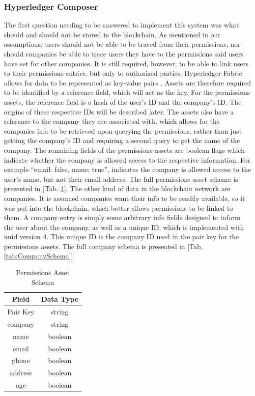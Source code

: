 \documentclass[11pt,journal]{IEEEtran}
\begin{document}
\subsubsection{Hyperledger Composer}
The first question needing to be answered to implement this system was what should and should not be stored in the blockchain. As mentioned in our assumptions, users should not be able to be traced from their permissions, nor should companies be able to trace users they have to the permissions said users have set for other companies. It is still required, however, to be able to link users to their permissions entries, but only to authorized parties. Hyperledger Fabric allows for data to be represented as key-value pairs \cite{WhyHyper54:online}. Assets are therefore required to be identified by a reference field, which will act as the key. For the permissions assets, the reference field is a hash of the user’s ID and the company’s ID. The origins of these respective IDs will be described later. The assets also have a reference to the company they are associated with, which allows for the companies info to be retrieved upon querying the permissions, rather than just getting the company’s ID and requiring a second query to get the name of the company. The remaining fields of the permissions assets are boolean flags which indicate whether the company is allowed access to the respective information. For example “email: false, name: true”, indicates the company is allowed access to the user’s name, but not their email address. The full permissions asset schema is presented in [Tab. \ref{tab:PermissionsSchema}]. The other kind of data in the blockchain network are companies. It is assumed companies want their info to be readily available, so it was put into the blockchain, which better allows permissions to be linked to them. A company entry is simply some arbitrary info fields designed to inform the user about the company, as well as a unique ID, which is implemented with uuid version 4. This unique ID is the company ID used in the pair key for the permissions assets. The full company schema is presented in [Tab. \ref{tab:CompanySchema}]. 

\begin{table}[H]
  \renewcommand{\arraystretch}{1.3}
  \caption{Permissions Asset Schema}
  \label{tab:PermissionsSchema}
  \centering
  \begin{tabular}{|c|c|}
    \hline
    Field & Data Type\\
    \hline    
    Pair Key & string \\
    company & string \\
    name & boolean \\
    email & boolean \\
    phone & boolean \\
    address & boolean \\
    age & boolean \\
    \hline
  \end{tabular}
\end{table}
\end{document}

